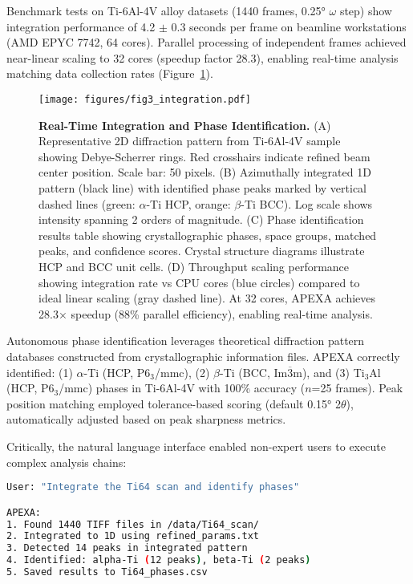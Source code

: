 \documentclass[11pt]{article}
\begin{document}
Benchmark tests on Ti-6Al-4V alloy datasets (1440 frames, 0.25° $\omega$ step) show integration performance of 4.2 $\pm$ 0.3 seconds per frame on beamline workstations (AMD EPYC 7742, 64 cores). Parallel processing of independent frames achieved near-linear scaling to 32 cores (speedup factor 28.3), enabling real-time analysis matching data collection rates (Figure~\ref{fig:integration}).

\begin{figure}[htbp]
\centering
\texttt{[image: figures/fig3\_integration.pdf]}
\caption{\textbf{Real-Time Integration and Phase Identification.} (A) Representative 2D diffraction pattern from Ti-6Al-4V sample showing Debye-Scherrer rings. Red crosshairs indicate refined beam center position. Scale bar: 50 pixels. (B) Azimuthally integrated 1D pattern (black line) with identified phase peaks marked by vertical dashed lines (green: $\alpha$-Ti HCP, orange: $\beta$-Ti BCC). Log scale shows intensity spanning 2 orders of magnitude. (C) Phase identification results table showing crystallographic phases, space groups, matched peaks, and confidence scores. Crystal structure diagrams illustrate HCP and BCC unit cells. (D) Throughput scaling performance showing integration rate vs CPU cores (blue circles) compared to ideal linear scaling (gray dashed line). At 32 cores, APEXA achieves 28.3$\times$ speedup (88\% parallel efficiency), enabling real-time analysis.}
\label{fig:integration}
\end{figure}

Autonomous phase identification leverages theoretical diffraction pattern databases constructed from crystallographic information files. APEXA correctly identified: (1) $\alpha$-Ti (HCP, P6$_3$/mmc), (2) $\beta$-Ti (BCC, Im$\overline{3}$m), and (3) Ti$_3$Al (HCP, P6$_3$/mmc) phases in Ti-6Al-4V with 100\% accuracy ($n$=25 frames). Peak position matching employed tolerance-based scoring (default 0.15° 2$\theta$), automatically adjusted based on peak sharpness metrics.

Critically, the natural language interface enabled non-expert users to execute complex analysis chains:
\begin{lstlisting}[language=bash, caption=Example user interaction]
User: "Integrate the Ti64 scan and identify phases"

APEXA:
1. Found 1440 TIFF files in /data/Ti64_scan/
2. Integrated to 1D using refined_params.txt
3. Detected 14 peaks in integrated pattern
4. Identified: alpha-Ti (12 peaks), beta-Ti (2 peaks)
5. Saved results to Ti64_phases.csv
\end{lstlisting}
\end{document}

